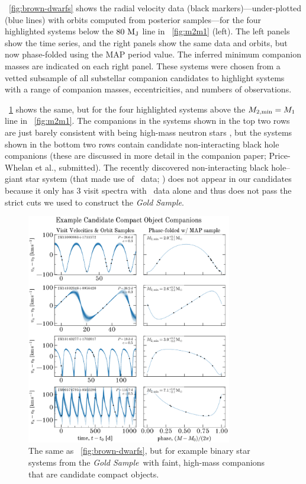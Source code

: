 \documentclass[modern]{aastex63}
\newcommand{\goldsample}{\textit{Gold Sample}}
\begin{document}
\figurename~\ref{fig:brown-dwarfs} shows the radial velocity data (black
markers)---under-plotted (blue lines) with orbits computed from posterior
samples---for the four highlighted systems below the $80~\mathrm{M}_{\mathrm{J}}$ line in
\figurename~\ref{fig:m2m1} (left).
The left panels show the time series, and the right panels show the same data
and orbits, but now phase-folded using the MAP period value.
The inferred minimum companion masses are indicated on each right panel.
These systems were chosen from a vetted subsample of all substellar companion
candidates to highlight systems with a range of companion masses,
eccentricities, and numbers of observations.

\figurename~\ref{fig:compact-objects} shows the same, but for the four
highlighted systems above the $M_{2, {\rm min}} = M_1$ line in
\figurename~\ref{fig:m2m1}.
The companions in the systems shown in the top two rows are just barely
consistent with being high-mass neutron stars \citep[e.g.,][]{Cromartie:2019},
but the systems shown in the bottom two rows contain candidate non-interacting
black hole companions (these are discussed in more detail in the companion
paper; Price-Whelan et al., submitted).
The recently discovered non-interacting black hole--giant star system (that made
use of \apogee\ data; \citealt{Thompson:2019}) does not appear in our candidates
because it only has 3 visit spectra with \apogee\ data alone and thus does not
pass the strict cuts we used to construct the \goldsample.

\begin{figure}[!t]
    \begin{center}
    \includegraphics[width=0.8\textwidth]{example-compact-objects.pdf}
    \end{center}
    \caption{%
    The same as \figurename~\ref{fig:brown-dwarfs}, but for example binary star
    systems from the \goldsample\ with faint, high-mass companions that are
    candidate compact objects.
    \label{fig:compact-objects}
    }
\end{figure}
\end{document}
